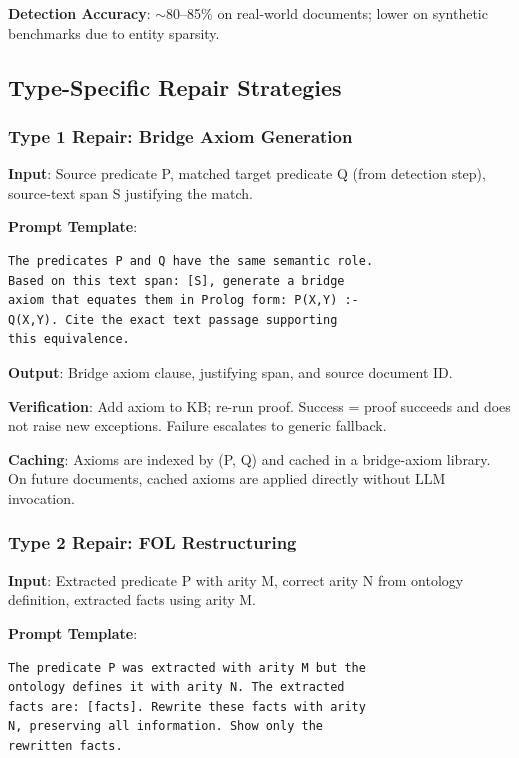 \documentclass[11pt,letterpaper]{article}
\begin{document}
\textbf{Detection Accuracy}: $\sim$80--85\% on real-world documents; lower on synthetic benchmarks due to entity sparsity.

\subsection{Type-Specific Repair Strategies}

\subsubsection{Type 1 Repair: Bridge Axiom Generation}

\textbf{Input}: Source predicate P, matched target predicate Q (from detection step), source-text span S justifying the match.

\textbf{Prompt Template}:
\begin{lstlisting}[basicstyle=\small\ttfamily,breaklines=true,frame=single]
The predicates P and Q have the same semantic role.
Based on this text span: [S], generate a bridge
axiom that equates them in Prolog form: P(X,Y) :-
Q(X,Y). Cite the exact text passage supporting
this equivalence.
\end{lstlisting}

\textbf{Output}: Bridge axiom clause, justifying span, and source document ID.

\textbf{Verification}: Add axiom to KB; re-run proof. Success = proof succeeds and does not raise new exceptions. Failure escalates to generic fallback.

\textbf{Caching}: Axioms are indexed by (P, Q) and cached in a bridge-axiom library. On future documents, cached axioms are applied directly without LLM invocation.

\subsubsection{Type 2 Repair: FOL Restructuring}

\textbf{Input}: Extracted predicate P with arity M, correct arity N from ontology definition, extracted facts using arity M.

\textbf{Prompt Template}:
\begin{lstlisting}[basicstyle=\small\ttfamily,breaklines=true,frame=single]
The predicate P was extracted with arity M but the
ontology defines it with arity N. The extracted
facts are: [facts]. Rewrite these facts with arity
N, preserving all information. Show only the
rewritten facts.
\end{lstlisting}
\end{document}
